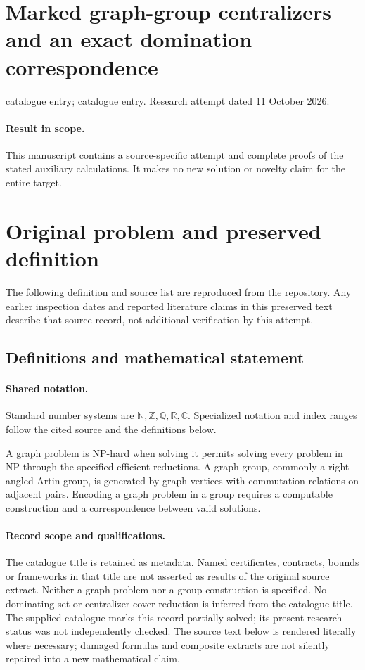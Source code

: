 \documentclass[11pt]{article}
\begin{document}
\section*{Marked graph-group centralizers and an exact domination correspondence}
\noindent catalogue entry; catalogue entry. Research attempt dated 11 October 2026.
\paragraph{Result in scope.}This manuscript contains a source-specific attempt and complete proofs of the stated auxiliary calculations. It makes no new solution or novelty claim for the entire target.
\section{Original problem and preserved definition}
The following definition and source list are reproduced from the repository. Any earlier inspection dates and reported literature claims in this preserved text describe that source record, not additional verification by this attempt.
\subsection{Definitions and mathematical statement}

\paragraph{Shared notation.}Standard number systems are $\mathbb N,\mathbb Z,\mathbb Q,\mathbb R,\mathbb C$. Specialized notation and index ranges follow the cited source and the definitions below.


A graph problem is NP-hard when solving it permits solving every problem in NP through the specified efficient reductions. A graph group, commonly a right-angled Artin group, is generated by graph vertices with commutation relations on adjacent pairs. Encoding a graph problem in a group requires a computable construction and a correspondence between valid solutions.
\paragraph{Record scope and qualifications.}
The catalogue title is retained as metadata. Named certificates, contracts, bounds or frameworks in that title are not asserted as results of the original source extract.
Neither a graph problem nor a group construction is specified. No dominating-set or centralizer-cover reduction is inferred from the catalogue title. The supplied catalogue marks this record partially solved; its present research status was not independently checked.
The source text below is rendered literally where necessary; damaged formulas and composite extracts are not silently repaired into a new mathematical claim.
\end{document}
